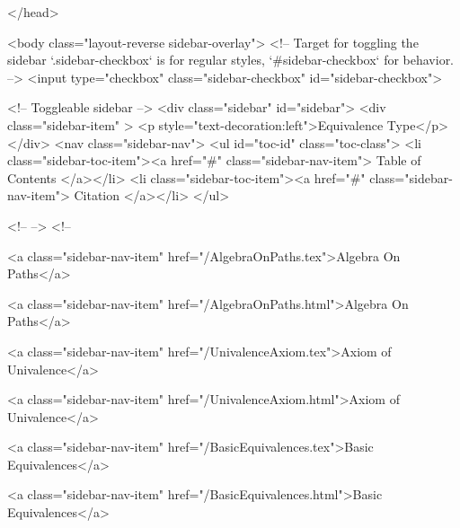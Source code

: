   
</head>




  <body class="layout-reverse sidebar-overlay">
    <!-- Target for toggling the sidebar `.sidebar-checkbox` is for regular
     styles, `#sidebar-checkbox` for behavior. -->
<input type="checkbox" class="sidebar-checkbox" id="sidebar-checkbox">

<!-- Toggleable sidebar -->
<div class="sidebar" id="sidebar">
  <div class="sidebar-item" >
    <p style="text-decoration:left">Equivalence Type</p>
  </div>
  <nav class="sidebar-nav">
    <ul id="toc-id" class="toc-class">
  <li class="sidebar-toc-item"><a href="#" class="sidebar-nav-item"> Table of Contents </a></li>
  <li class="sidebar-toc-item"><a href="#" class="sidebar-nav-item"> Citation </a></li>
</ul>


    <!--  -->
    <!-- 
      
    
      
    
      
    
      
    
      
        
      
    
      
        
          <a class="sidebar-nav-item" href="/AlgebraOnPaths.tex">Algebra On Paths</a>
        
      
    
      
        
          <a class="sidebar-nav-item" href="/AlgebraOnPaths.html">Algebra On Paths</a>
        
      
    
      
        
          <a class="sidebar-nav-item" href="/UnivalenceAxiom.tex">Axiom of Univalence</a>
        
      
    
      
        
          <a class="sidebar-nav-item" href="/UnivalenceAxiom.html">Axiom of Univalence</a>
        
      
    
      
        
          <a class="sidebar-nav-item" href="/BasicEquivalences.tex">Basic Equivalences</a>
        
      
    
      
        
          <a class="sidebar-nav-item" href="/BasicEquivalences.html">Basic Equivalences</a>
        
